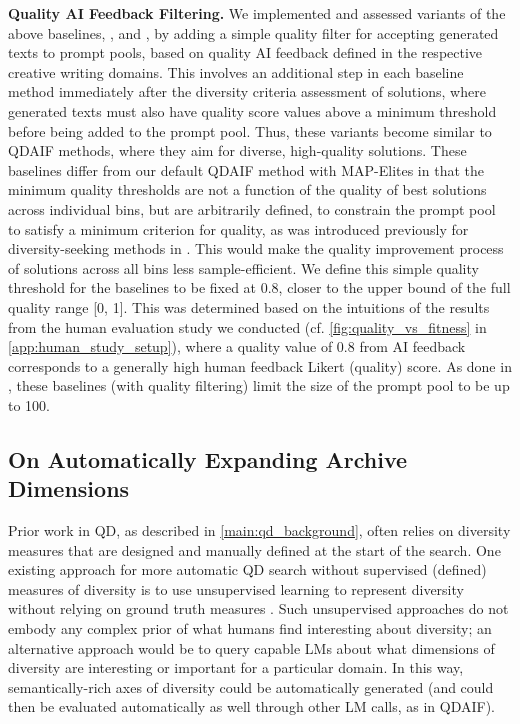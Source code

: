 \textbf{Quality AI Feedback Filtering.} We implemented and assessed variants of the above baselines, \basefiveq, and \basesixq, by adding a simple quality filter for accepting generated texts to prompt pools, based on quality AI feedback defined in the respective creative writing domains. This involves an additional step in each baseline method immediately after the diversity criteria assessment of solutions, where generated texts must also have quality score values above a minimum threshold before being added to the prompt pool. Thus, these variants become similar to QDAIF methods, where they aim for diverse, high-quality solutions. These baselines differ from our default QDAIF method with MAP-Elites in that the minimum quality thresholds are not a function of the quality of best solutions across individual bins, but are arbitrarily defined, to constrain the prompt pool to satisfy a minimum criterion for quality, as was introduced previously for diversity-seeking methods in \citet{lehman2010revising}. This would make the quality improvement process of solutions across all bins less sample-efficient. We define this simple quality threshold for the baselines to be fixed at 0.8, closer to the upper bound of the full quality range [0, 1]. This was determined based on the intuitions of the results from the human evaluation study we conducted (cf. \cref{fig:quality_vs_fitness} in \cref{app:human_study_setup}), where a quality value of 0.8 from AI feedback corresponds to a generally high human feedback Likert (quality) score. As done in \basefour, these baselines (with quality filtering) limit the size of the prompt pool to be up to 100.


\clearpage
\newpage
\subsection{On Automatically Expanding Archive Dimensions}\label{app:expanding_dim}
Prior work in QD, as described in \cref{main:qd_background}, often relies on diversity measures that are designed and manually defined at the start of the search. One existing approach for more automatic QD search without supervised (defined) measures of diversity is to use unsupervised learning to represent diversity without relying on ground truth measures \citep{cully2018hierarchical,cully2019autonomous,grillotti2021unsupervised,wang2023diversity,ding2023quality}. Such unsupervised approaches do not embody any complex prior of what humans find interesting about diversity; an alternative approach would be to query capable LMs about what dimensions of diversity are interesting or important for a particular domain. In this way, semantically-rich axes of diversity could be automatically generated (and could then be evaluated automatically as well through other LM calls, as in QDAIF).

